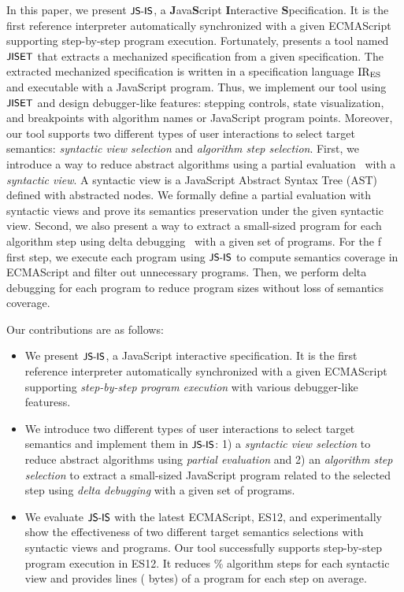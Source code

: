 In this paper, we present $\textsf{\small JS-IS}$, a \textbf{J}ava\textbf{S}cript
\textbf{I}nteractive \textbf{S}pecification. It is the first reference
interpreter automatically synchronized with a given ECMAScript supporting
step-by-step program execution. Fortunately, \citet{jiset} presents a tool named
$\textsf{\small JISET}$ that extracts a mechanized specification from a given specification.
The extracted mechanized specification is written in a specification language
$\text{IR}_\text{ES}$ and executable with a JavaScript program. Thus, we implement our tool
using $\textsf{\small JISET}$ and design debugger-like features: stepping controls, state
visualization, and breakpoints with algorithm names or JavaScript program
points. Moreover, our tool supports two different types of user interactions to
select target semantics: \textit{syntactic view selection} and \textit{algorithm
step selection}. First, we introduce a way to reduce abstract algorithms using a
partial evaluation~\cite{peval, peval-survey, trans-ai} with a \textit{syntactic
view}. A syntactic view is a JavaScript Abstract Syntax Tree (AST) defined with
abstracted nodes. We formally define a partial evaluation with syntactic views
and prove its semantics preservation under the given syntactic view. Second, we
also present a way to extract a small-sized program for each algorithm step
using delta debugging~\cite{delta-debugging} with a given set of programs. For
the f first step, we execute each program using $\textsf{\small JS-IS}$ to compute semantics
coverage in ECMAScript and filter out unnecessary programs. Then, we perform
delta debugging for each program to reduce program sizes without loss of
semantics coverage.

Our contributions are as follows:
\begin{itemize}
  \item We present $\textsf{\small JS-IS}$, a JavaScript interactive specification. It is the
    first reference interpreter automatically synchronized with a given
    ECMAScript supporting \textit{step-by-step program execution} with various
    debugger-like featuress.

  \item We introduce two different types of user interactions to select target
    semantics and implement them in $\textsf{\small JS-IS}$: 1) a \textit{syntactic view
    selection} to reduce abstract algorithms using \textit{partial evaluation}
    and 2) an \textit{algorithm step selection} to extract a small-sized
    JavaScript program related to the selected step using \textit{delta
    debugging} with a given set of programs.

  \item We evaluate $\textsf{\small JS-IS}$ with the latest ECMAScript, ES12, and experimentally
    show the effectiveness of two different target semantics selections with
     syntactic views and  programs. Our tool
    successfully supports step-by-step program execution in ES12. It reduces
    \% algorithm steps for each syntactic view and provides
     lines ( bytes) of a program for each step on
    average.
\end{itemize}
